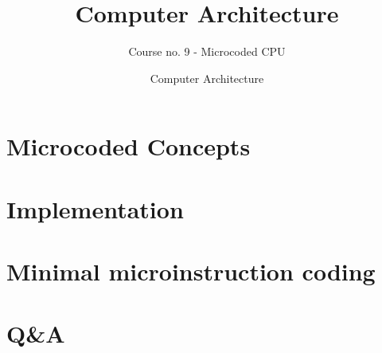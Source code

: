\documentclass[usenames,dvipsnames]{beamer}             %
\title[Computer Architecture] %
{Computer Architecture}
\subtitle{Course no. 9 - Microcoded CPU}
\author[Ștefan-Dan Ciocîrlan] %
{}
\institute[NUSTPB] %
{
  \inst{}%
  National University of Science and Technology\\
  POLITEHNICA Bucharest
}
\date[NUSTPB 2024] %
{Computer Architecture}
\begin{document}
\frame{\titlepage}

\section{Microcoded Concepts}


\section{Implementation}


\section{Minimal microinstruction coding}




\section{Q\&A}
\begin{frame}
\end{frame}

\end{document}

